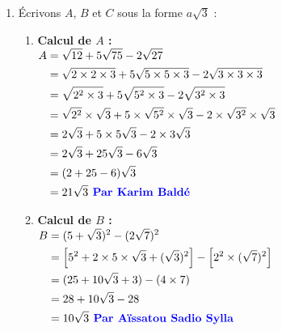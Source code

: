 \documentclass[12pt,a4paper]{article}
\begin{document}
\begin{enumerate}
    \item Écrivons $A$, $B$ et $C$ sous la forme $a\sqrt{3}$ :
    \begin{enumerate}
        \item \textbf{Calcul de $A$ :} \\
        $
        \begin{aligned}
        A &= \sqrt{12} + 5\sqrt{75} - 2\sqrt{27} \\
        &= \sqrt{2 \times 2 \times 3} + 5\sqrt{5 \times 5 \times 3} - 2\sqrt{3 \times 3 \times 3} \\
        &= \sqrt{2^2 \times 3} + 5\sqrt{5^2 \times 3} - 2\sqrt{3^2 \times 3} \\
        &= \sqrt{2^2} \times \sqrt{3} + 5 \times \sqrt{5^2} \times \sqrt{3} - 2 \times \sqrt{3^2} \times \sqrt{3} \\
        &= 2\sqrt{3} + 5 \times 5\sqrt{3} - 2 \times 3\sqrt{3} \\
        &= 2\sqrt{3} + 25\sqrt{3} - 6\sqrt{3} \\
        &= (2 + 25 - 6)\sqrt{3} \\
        &= 21\sqrt{3} \textbf{ \textcolor{blue}{ Par Karim Baldé}}
        \end{aligned}
        $

        \item \textbf{Calcul de $B$ :} \\
        
        $
        \begin{aligned}
        B &= (5 + \sqrt{3})^2 - (2\sqrt{7})^2 \\
        &= \left[5^2 + 2 \times 5 \times \sqrt{3} + (\sqrt{3})^2\right] - \left[2^2 \times (\sqrt{7})^2\right] \\
        &= (25 + 10\sqrt{3} + 3) - (4 \times 7) \\
        &= 28 + 10\sqrt{3} - 28 \\
        &= 10\sqrt{3} \textbf{ \textcolor{blue}{ Par Aïssatou Sadio Sylla}}
        \end{aligned}
        $
		

\end{enumerate}
\end{enumerate}
\end{document}
